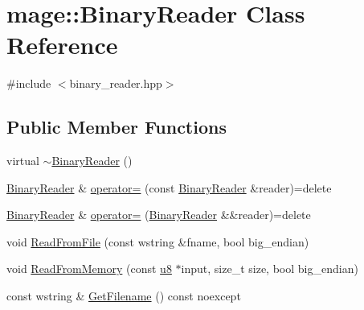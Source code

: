 \hypertarget{classmage_1_1_binary_reader}{}\section{mage\+:\+:Binary\+Reader Class Reference}
\label{classmage_1_1_binary_reader}


{\ttfamily \#include $<$binary\+\_\+reader.\+hpp$>$}

\subsection*{Public Member Functions}
\begin{DoxyCompactItemize}
\item 
virtual \hyperlink{classmage_1_1_binary_reader_a42e6c31bc53f5214675f845756b5a404}{$\sim$\+Binary\+Reader} ()
\item 
\hyperlink{classmage_1_1_binary_reader}{Binary\+Reader} \& \hyperlink{classmage_1_1_binary_reader_a0408bb456983b4a03ae42ab69c6f4bc3}{operator=} (const \hyperlink{classmage_1_1_binary_reader}{Binary\+Reader} \&reader)=delete
\item 
\hyperlink{classmage_1_1_binary_reader}{Binary\+Reader} \& \hyperlink{classmage_1_1_binary_reader_abb971fe92727a0e86b3698dba8c586de}{operator=} (\hyperlink{classmage_1_1_binary_reader}{Binary\+Reader} \&\&reader)=delete
\item 
void \hyperlink{classmage_1_1_binary_reader_aa9cc5e2bd41cd5ae5ee421ee9a1e10b2}{Read\+From\+File} (const wstring \&fname, bool big\+\_\+endian)
\item 
void \hyperlink{classmage_1_1_binary_reader_a918f751ba7ae721512f7117aff0576d3}{Read\+From\+Memory} (const \hyperlink{namespacemage_a5a362e2d56fc439362a80516ecae7828}{u8} $\ast$input, size\+\_\+t size, bool big\+\_\+endian)
\item 
const wstring \& \hyperlink{classmage_1_1_binary_reader_ad9d4a4a3e2f0afc666d15badff08fe4a}{Get\+Filename} () const noexcept
\end{DoxyCompactItemize}
